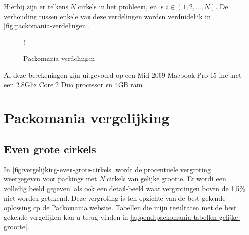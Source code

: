 \documentclass[12pt,a4paper,oneside]{book}
\begin{document}
Hierbij zijn er telkens $N$ cirkels in het probleem, en is $i \in (1,2,...,N)$.
De verhouding tussen enkele van deze verdelingen worden verduidelijk in \autoref{fig:packomania-verdelingen}.

\begin {figure}
	\centering
	 {!} {
	}
	\caption{Packomania verdelingen}
	\label{fig:packomania-verdelingen}
\end {figure}

Al deze berekeningen zijn uitgevoerd op een Mid 2009 Macbook-Pro 15 inc met een 2.8Ghz Core 2 Duo processor en 4GB ram.

\section{Packomania vergelijking}

\subsection{Even grote cirkels}

In \autoref{fig:vergelijking-even-grote-cirkels} wordt de procentuele vergroting weergegeven voor packings met $N$ cirkels van gelijke grootte.
Er wordt een volledig beeld gegeven, als ook een detail-beeld waar vergrotingen boven de 1,5\% niet worden getekend.
Deze vergroting is ten opzichte van de best gekende oplossing op de Packomania website.
Tabellen die mijn resultaten met de best gekende vergelijken kan u terug vinden in \autoref{append:packomania-tabellen-gelijke-grootte}.
\end{document}
